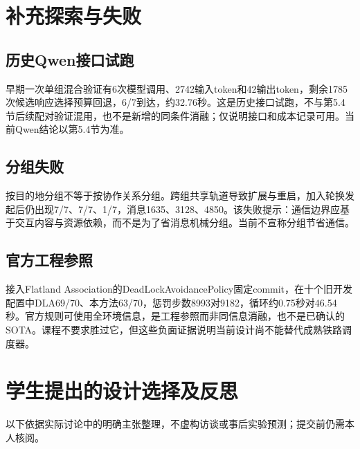 \hypertarget{ux8865ux5145ux63a2ux7d22ux4e0eux5931ux8d25}{%
\chapter{补充探索与失败}\label{ux8865ux5145ux63a2ux7d22ux4e0eux5931ux8d25}}

\hypertarget{ux5386ux53f2qwenux63a5ux53e3ux8bd5ux8dd1}{%
\section{历史Qwen接口试跑}\label{ux5386ux53f2qwenux63a5ux53e3ux8bd5ux8dd1}}

早期一次单组混合验证有6次模型调用、2742输入token和42输出token，剩余1785次候选响应选择预算回退，6/7到达，约32.76秒。这是历史接口试跑，不与第5.4节后续配对验证混用，也不是新增的同条件消融；仅说明接口和成本记录可用。当前Qwen结论以第5.4节为准。

\hypertarget{ux5206ux7ec4ux5931ux8d25}{%
\section{分组失败}\label{ux5206ux7ec4ux5931ux8d25}}

按目的地分组不等于按协作关系分组。跨组共享轨道导致扩展与重启，加入轮换发起后仍出现7/7、7/7、1/7，消息1635、3128、4850。该失败提示：通信边界应基于交互内容与资源依赖，而不是为了省消息机械分组。当前不宣称分组节省通信。

\hypertarget{ux5b98ux65b9ux5de5ux7a0bux53c2ux7167}{%
\section{官方工程参照}\label{ux5b98ux65b9ux5de5ux7a0bux53c2ux7167}}

接入Flatland
Association的DeadLockAvoidancePolicy固定commit，在十个旧开发配置中DLA69/70、本方法63/70，惩罚步数8993对9182，循环约0.75秒对46.54秒。官方规则可使用全环境信息，是工程参照而非同信息消融，也不是已确认的SOTA。课程不要求胜过它，但这些负面证据说明当前设计尚不能替代成熟铁路调度器。

\hypertarget{ux5b66ux751fux63d0ux51faux7684ux8bbeux8ba1ux9009ux62e9ux53caux53cdux601d}{%
\chapter{学生提出的设计选择及反思}\label{ux5b66ux751fux63d0ux51faux7684ux8bbeux8ba1ux9009ux62e9ux53caux53cdux601d}}

以下依据实际讨论中的明确主张整理，不虚构访谈或事后实验预测；提交前仍需本人核阅。

